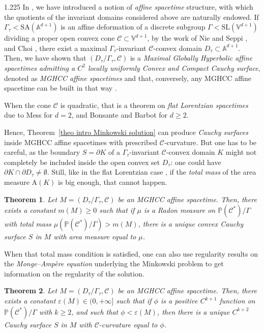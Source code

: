 \documentclass[reqno, a4paper]{amsart}
\numberwithin{equation}{section}
\numberwithin{figure}{section}
\newtheorem{maintheorem}{Theorem}
\theoremstyle{definition}
\theoremstyle{remark}
\newcommand{\V}{\mathbb{V}} %
\newcommand{\A}{\mathbb{A}} %
\renewcommand{\P}{\mathbb{P}} %
\newcommand{\SL}{\mathrm{SL}} %
\newcommand{\SA}{\mathrm{SA}} %
\newcommand{\C}{\mathcal{C}} %
\newcommand{\Area}{\mathrm{A}} %
\begin{document}
\begin{spacing}{1.225}
In \cite{Ablondi_25}, we have introduced a notion of \emph{affine spacetime} structure, with which the quotients of the invariant domains considered above are naturally endowed. If $\Gamma_\tau < \SA(\A^{d+1}) $ is an affine deformation of a discrete subgroup $\Gamma < \SL(\V^{d+1})$ dividing a proper open convex cone $\C \subset \V^{d+1}$, by the work of Nie and Seppi \cite{Nie_Seppi_23}, and Choi \cite{Choi_25}, there exist a maximal $\Gamma_\tau$-invariant $\C$-convex domain $D_\tau \subset \A^{d+1}$. Then, we have shown that $(D_\tau/\Gamma_\tau,\C)$  is a \emph{Maximal Globally Hyperbolic affine spacetimes admitting a $C^2$ locally uniformly Convex and Compact Cauchy surface}, denoted as \emph{MGHCC affine spacetimes} and that, conversely, any MGHCC affine spacetime can be built in that way \cite[Theorems I and II]{Ablondi_25}. 

When the cone $\C$ is quadratic, that is a theorem on \emph{flat Lorentzian spacetimes} due to Mess \cite{Mess_07,Mess_notes} for $d=2$, and Bonsante \cite{Bonsante_05} and Barbot \cite{Barbot_05} for $d \geq 2$. 

Hence, Theorem~\ref{theo intro Minkowski solution} can produce \emph{Cauchy surfaces} inside MGHCC affine spacetimes with prescribed $\C$-curvature. But one has to be careful, as the boundary $S= \partial K$ of a $\Gamma_\tau$-invariant $\C$-convex domain $K$ might not completely be included inside the open convex set $D_\tau$: one could have $\partial K \cap \partial D_\tau \neq \emptyset$. Still, like in the flat Lorentzian case \cite[Theorem~1.4]{Bonsante_Fillastre_17}, if the \emph{total mass} of the area measure $\Area(K)$ is big enough, that cannot happen. 

\begin{maintheorem}
\label{theo intro Minkowski pb in MGHCC measure}
Let $M = (D_\tau/\Gamma_\tau,\C)$ be an MGHCC affine spacetime. Then, there exists a constant $m(M) \geq 0$ such that if $\mu$ is a Radon measure on $\P(\C^*)/\Gamma$ with total mass $\mu(\P(\C^*)/\Gamma) > m(M)$, there is a unique convex Cauchy surface $S$ in $M$ with area measure equal to $\mu$. 
\end{maintheorem}

When that total mass condition is satisfied, one can also use regularity results on the \emph{Monge--Amp\`ere equation} underlying the Minkowski problem to get information on the regularity of the solution.

\begin{maintheorem}
\label{theo intro Minkowski pb in MGHCC reg}
Let $M = (D_\tau/\Gamma_\tau,\C)$ be an MGHCC affine spacetime. Then, there exists a constant $\varepsilon(M) \in (0,+\infty]$ such that if $\phi$ is a positive $C^{k+1}$ function on $\P(\C^*)/\Gamma$ with $k\geq 2$, and such that $\phi<\varepsilon(M)$, then there is a unique $C^{k+2}$ Cauchy surface $S$ in $M$ with $\C$-curvature equal to $\phi$. 


\end{maintheorem}
\end{spacing}
\end{document}
